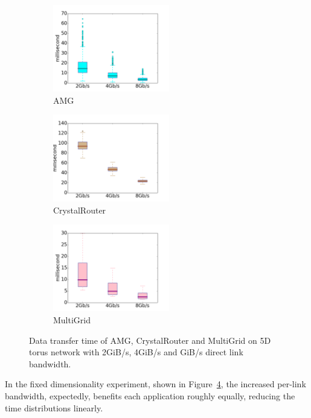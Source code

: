 \begin{figure}[t!]
    \centering
    \begin{subfigure}[t]{0.32\textwidth}
        \centering
        \includegraphics[height=1.5in]{figs/bandwidthstudy/amg_bw_box}
        \caption{AMG}
        \label{fig:bdwstudy-amg}
    \end{subfigure}%
    \hspace{1em}%
    \begin{subfigure}[t]{0.32\textwidth}
        \centering
        \includegraphics[height=1.5in]{figs/bandwidthstudy/cr_bw_box}
        \caption{CrystalRouter}
        \label{fig:bdwstudy-cr}
    \end{subfigure}%
    \begin{subfigure}[t]{0.32\textwidth}
        \centering
        \includegraphics[height=1.5in]{figs/bandwidthstudy/mg_bw_box}
        \caption{MultiGrid}
        \label{fig:bdwstudy-mg}
    \end{subfigure}%
   \caption{Data transfer time of AMG, CrystalRouter and MultiGrid on 5D torus network with 2GiB/s, 4GiB/s and GiB/s direct link bandwidth. }
   \label{fig:bandwidth-study}
\end{figure}

In the fixed dimensionality experiment, shown in Figure~\ref{fig:bandwidth-study}, the increased per-link bandwidth, expectedly, benefits each application roughly equally, reducing the time distributions linearly.

